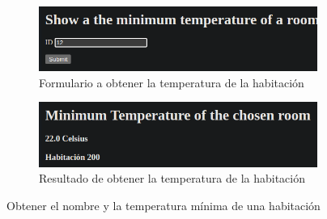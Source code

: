 \documentclass[11pt]{report}
\begin{document}
\begin{figure}[H]
  \begin{subfigure}{0.5\textwidth}
    \centering
    \includegraphics[scale=0.34]{img/min_temperature.png}
    \caption{Formulario a obtener la temperatura de la habitación}
  \end{subfigure}%
  \begin{subfigure}{0.5\textwidth}
    \centering
    \includegraphics[scale=0.34]{img/result_min_temperature.png}
    \caption{Resultado de obtener la temperatura de la habitación}
  \end{subfigure}
  \caption{Obtener el nombre y la temperatura mínima de una habitación}
\end{figure}
\end{document}

